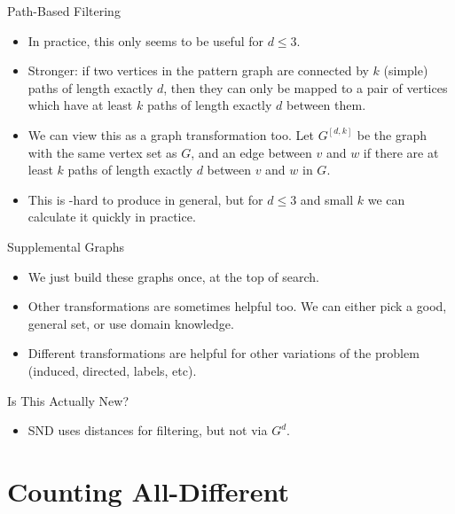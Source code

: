 \documentclass{beamer}
\begin{document}
\begin{frame}{Path-Based Filtering}
    \begin{itemize}
        \item In practice, this only seems to be useful for $d \le 3$.

        \item Stronger: if two vertices in the pattern graph are connected by $k$ (simple) paths of
            length exactly $d$, then they can only be mapped to a pair of vertices which have at
            least $k$ paths of length exactly $d$ between them.

        \item We can view this as a graph transformation too. Let $G^{\left[d, k\right]}$ be the
            graph with the same vertex set as $G$, and an edge between $v$ and $w$ if there are at
            least $k$ paths of length exactly $d$ between $v$ and $w$ in $G$.

        \item This is \NP-hard to produce in general, but for $d \le 3$ and small $k$ we can
            calculate it quickly in practice.
    \end{itemize}
\end{frame}

\begin{frame}{Supplemental Graphs}
    \begin{itemize}
        \item We just build these graphs once, at the top of search.

        \item Other transformations are sometimes helpful too. We can either pick a good,
            general set, or use domain knowledge.

        \item Different transformations are helpful for other variations of the problem
            (induced, directed, labels, etc).
    \end{itemize}
\end{frame}

\begin{frame}{Is This Actually New?}
    \begin{itemize}
        \item SND uses distances for filtering, but not via $G^d$.
    \end{itemize}
\end{frame}

\section{Counting All-Different}
\end{document}

